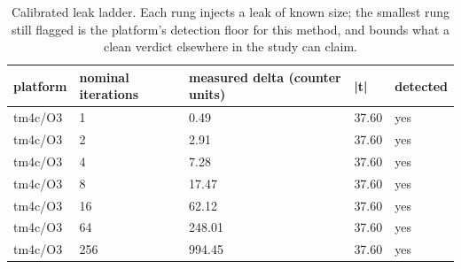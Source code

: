 \begin{table}[t]
  \centering
  \caption{Calibrated leak ladder. Each rung injects a leak of known size; the smallest rung still flagged is the platform's detection floor for this method, and bounds what a clean verdict elsewhere in the study can claim.}
  \label{tab:detectionfloor}
  \begin{tabular}{lllll}
    \toprule
    platform & nominal iterations & measured delta (counter units) & |t| & detected \\
    \midrule
    tm4c/O3 & 1 & 0.49 & 37.60 & yes \\
    tm4c/O3 & 2 & 2.91 & 37.60 & yes \\
    tm4c/O3 & 4 & 7.28 & 37.60 & yes \\
    tm4c/O3 & 8 & 17.47 & 37.60 & yes \\
    tm4c/O3 & 16 & 62.12 & 37.60 & yes \\
    tm4c/O3 & 64 & 248.01 & 37.60 & yes \\
    tm4c/O3 & 256 & 994.45 & 37.60 & yes \\
    \bottomrule
  \end{tabular}
\end{table}
